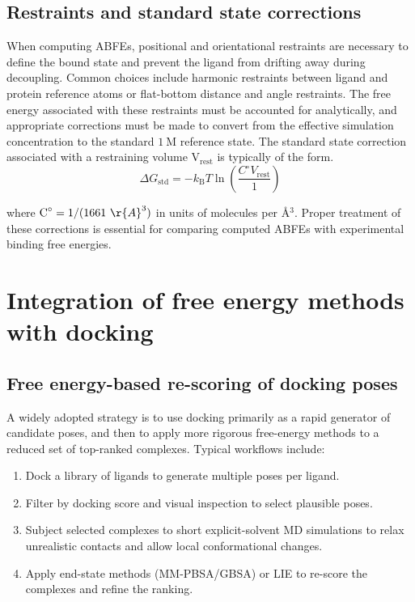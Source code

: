 \documentclass[12pt]{article}
\begin{document}
\subsection{Restraints and standard state corrections}

When computing ABFEs, positional and orientational restraints are necessary to define the bound state and prevent the ligand from drifting away during decoupling. Common choices include harmonic restraints between ligand and protein reference atoms or flat-bottom distance and angle restraints\cite{CH10_gilson1997calculation,CH10_deng2009abfe}. The free energy associated with these restraints must be accounted for analytically, and appropriate corrections must be made to convert from the effective simulation concentration to the standard $\textrm{1}\ \textrm{M}$ reference state. The standard state correction associated with a restraining volume $\textrm{V}_\textrm{rest}$ is typically of the form.
\begin{equation}
\Delta G_\mathrm{std} = -k_\mathrm{B}T \ln \left( \frac{C^\circ V_\mathrm{rest}}{1} \right)
\end{equation}

where $\textrm{C}^\circ = \textrm{1}/(\textrm{1661} \ \r{A}^\textrm{3})$ in units of molecules per \r{A}$^3$.  Proper treatment of these corrections is essential for comparing computed ABFEs with experimental binding free energies. 

\section{Integration of free energy methods with docking}

\subsection{Free energy-based re-scoring of docking poses}

A widely adopted strategy is to use docking primarily as a rapid generator of candidate poses, and then to apply more rigorous free-energy methods to a reduced set of top-ranked complexes\cite{CH10_hou2011endpointhou,CH10_michel2006binding}. 
Typical workflows include:
\begin{enumerate}
  \item Dock a library of ligands to generate multiple poses per ligand.
  \item Filter by docking score and visual inspection to select plausible poses.
  \item Subject selected complexes to short explicit-solvent MD simulations to relax unrealistic contacts and allow local conformational changes.
  \item Apply end-state methods (MM-PBSA/GBSA) or LIE to re-score the complexes and refine the ranking.
\end{enumerate}
\end{document}
